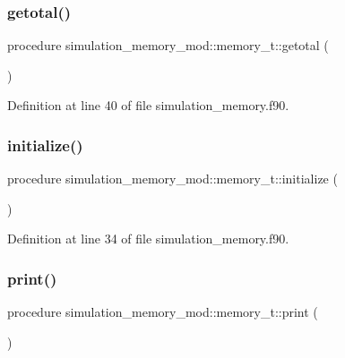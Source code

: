 \subsubsection{\texorpdfstring{getotal()}{getotal()}}
{\footnotesize\ttfamily procedure simulation\+\_\+memory\+\_\+mod\+::memory\+\_\+t\+::getotal (\begin{DoxyParamCaption}{ }\end{DoxyParamCaption})\hspace{0.3cm}{\ttfamily [private]}}



Definition at line 40 of file simulation\+\_\+memory.\+f90.

\mbox{\label{structsimulation__memory__mod_1_1memory__t_aba98543cee9846320a3cb7b522d32525}} 
\subsubsection{\texorpdfstring{initialize()}{initialize()}}
{\footnotesize\ttfamily procedure simulation\+\_\+memory\+\_\+mod\+::memory\+\_\+t\+::initialize (\begin{DoxyParamCaption}{ }\end{DoxyParamCaption})\hspace{0.3cm}{\ttfamily [private]}}



Definition at line 34 of file simulation\+\_\+memory.\+f90.

\mbox{\label{structsimulation__memory__mod_1_1memory__t_a12a39d94e7e4e9b857d0a5613dd01996}} 
\subsubsection{\texorpdfstring{print()}{print()}}
{\footnotesize\ttfamily procedure simulation\+\_\+memory\+\_\+mod\+::memory\+\_\+t\+::print (\begin{DoxyParamCaption}{ }\end{DoxyParamCaption})\hspace{0.3cm}{\ttfamily [private]}}



